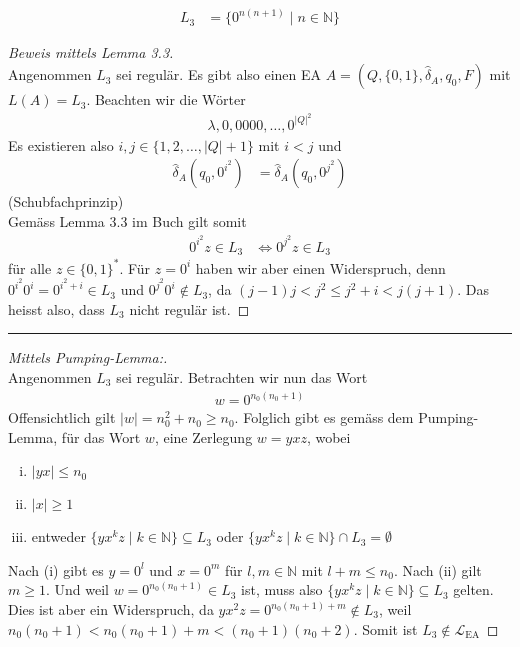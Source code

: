 \documentclass[a4paper,ngerman,12pt]{exam}
\begin{document}
\begin{questions}
\begin{parts}
\begin{align*}
  L_3 &= \{0^{n(n+1)} \mid n \in \mathbb{N} \}
\end{align*}
\begin{solutionorbox}
      \begin{proof}[Beweis mittels Lemma 3.3] $ $\\
    Angenommen $L_3$ sei regulär.
    Es gibt also einen EA $A = (Q, \{0, 1\}, \hat{\delta}_A, q_0, F)$ mit $L(A) = L_3$.
    Beachten wir die Wörter
    \begin{align*}
      \lambda, 0, 0000, \dots , 0^{|Q|^2}
    \end{align*}
    Es existieren also $i, j \in \{1, 2, \dots, |Q|+1\}$ mit $i < j$
    und
    \begin{align*}
      \hat{\delta}_A(q_0, 0^{i^2}) &= \hat{\delta}_A(q_0, 0^{j^2})
    \end{align*}
    (Schubfachprinzip)\\
    Gemäss Lemma 3.3 im Buch gilt somit
    \begin{align*}
      0^{i^2} z \in L_3 &\iff 0^{j^2} z \in L_3
    \end{align*}
    für alle $z \in \{0, 1\}^*$. Für $z = 0^{i}$ haben wir aber einen Widerspruch,
        denn
        $0^{i^2} 0^{i} = 0^{i^2+i} \in L_3$ und $0^{j^2} 0^{i} \not\in L_3$,
        da $(j-1)j < j^2 \leq j^2 + i  < j(j+1)$.
        Das heisst also, dass
    $L_3$ nicht regulär ist.
      \end{proof}

      \hrule

      \begin{proof}[Mittels Pumping-Lemma:] $ $\\
        Angenommen $L_3$ sei regulär. Betrachten wir nun das Wort
        \begin{align*}
          w = 0^{n_0(n_0 + 1)}
        \end{align*}
        Offensichtlich gilt $|w| = n_0^2 + n_0 \geq n_0$.
        Folglich gibt es gemäss dem Pumping-Lemma, für das Wort $w$, eine Zerlegung
        $w = yxz$, wobei
        \begin{enumerate}[(i)]
          \item $|yx| \leq n_0$
          \item $|x| \geq 1$
          \item entweder $\{y x^k z \mid k \in \mathbb{N}\} \subseteq L_3$
            oder $\{y x^k z \mid k \in \mathbb{N}\} \cap L_3 = \emptyset$
        \end{enumerate}
        Nach (i) gibt es $y = 0^l$ und $x = 0^m$ für $l,m \in \mathbb{N}$
        mit $l+m \leq n_0$. Nach (ii) gilt $m \geq 1$. Und weil
        $w = 0^{n_0(n_0 + 1)} \in L_3$ ist, muss also
        $\{y x^k z \mid k \in \mathbb{N}\} \subseteq L_3$ gelten. Dies ist aber ein
        Widerspruch, da
        $yx^2z = 0^{n_0(n_0+1)+m} \not\in L_3$,
        weil $n_0(n_0 + 1) < n_0(n_0+1) + m < (n_0+1)(n_0 + 2)$.
        Somit ist
        $L_3 \not\in \mathcal{L}_{\mathrm{EA}}$
      \end{proof}


\end{solutionorbox}
\end{parts}
\end{questions}
\end{document}
